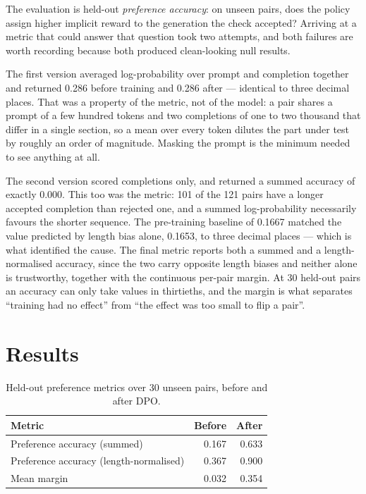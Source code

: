 The evaluation is held-out \emph{preference accuracy}: on unseen pairs, does the
policy assign higher implicit reward to the generation the check accepted?
Arriving at a metric that could answer that question took two attempts, and both
failures are worth recording because both produced clean-looking null results.

The first version averaged log-probability over prompt and completion together
and returned 0.286 before training and 0.286 after --- identical to three
decimal places. That was a property of the metric, not of the model: a pair
shares a prompt of a few hundred tokens and two completions of one to two
thousand that differ in a single section, so a mean over every token dilutes the
part under test by roughly an order of magnitude. Masking the prompt is the
minimum needed to see anything at all.

The second version scored completions only, and returned a summed accuracy of
exactly 0.000. This too was the metric: 101 of the 121 pairs have a longer
accepted completion than rejected one, and a summed log-probability necessarily
favours the shorter sequence. The pre-training baseline of 0.1667 matched the
value predicted by length bias alone, 0.1653, to three decimal places --- which
is what identified the cause. The final metric reports both a summed and a
length-normalised accuracy, since the two carry opposite length biases and
neither alone is trustworthy, together with the continuous per-pair margin. At
30 held-out pairs an accuracy can only take values in thirtieths, and the margin
is what separates ``training had no effect'' from ``the effect was too small to
flip a pair''.

\section{Results}
\label{sec:po-results}

\begin{table}[htbp]
\centering\small
\caption{Held-out preference metrics over 30 unseen pairs, before and after DPO.}
\label{tab:dpo-results}
\begin{tabularx}{\textwidth}{Xrr}
\toprule
\textbf{Metric} & \textbf{Before} & \textbf{After} \\
\midrule
Preference accuracy (summed)            & 0.167 & 0.633 \\
Preference accuracy (length-normalised) & 0.367 & 0.900 \\
Mean margin                             & 0.032 & 0.354 \\
\bottomrule
\end{tabularx}
\end{table}

